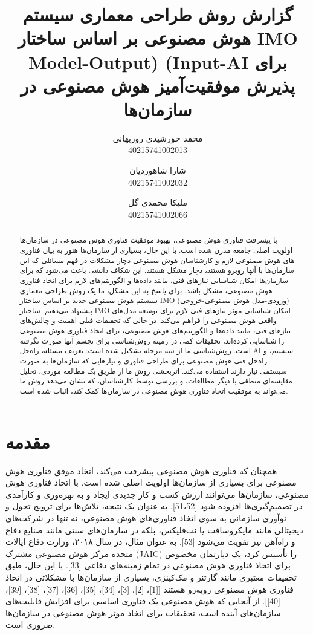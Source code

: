 \documentclass[a4paper,10pt]{article}
\title{گزارش روش طراحی معماری سیستم هوش مصنوعی بر اساس ساختار IMO Model-Output) (Input-AI برای پذیرش موفقیت‌آمیز هوش مصنوعی در سازمان‌ها}
\author{محمد خورشیدی روزبهانی\\40215741002013 \and شارا شاهوردیان\\40215741002032 \and ملیکا محمدی گل\\40215741002066}
\date{}
\begin{document}
    \maketitle

    \vspace{0.5cm}

    \begin{abstract}
        
        با پیشرفت فناوری هوش مصنوعی، بهبود موفقیت فناوری هوش مصنوعی در سازمان‌ها اولویت اصلی جامعه مدرن شده است. با این حال، بسیاری از سازمان‌ها هنوز به بیان فناوری های هوش مصنوعی لازم و کارشناسان هوش مصنوعی دچار مشکلات در فهم مسائلی که این سازمان‌ها با آنها روبرو هستند، دچار مشکل هستند. این شکاف دانشی باعث می‌شود که برای سازمان‌ها امکان شناسایی نیازهای فنی، مانند داده‌ها و الگوریتم‌های لازم برای اتخاذ فناوری هوش مصنوعی، مشکل باشد. برای پاسخ به این مشکل، ما یک روش طراحی معماری سیستم هوش مصنوعی جدید بر اساس ساختار IMO (ورودی-مدل هوش مصنوعی-خروجی) پیشنهاد می‌دهیم. ساختار IMO امکان شناسایی موثر نیازهای فنی لازم برای توسعه مدل‌های واقعی هوش مصنوعی را فراهم می‌کند. در حالی که تحقیقات قبلی اهمیت و چالش‌های نیازهای فنی، مانند داده‌ها و الگوریتم‌های هوش مصنوعی، برای اتخاذ فناوری هوش مصنوعی را شناسایی کرده‌اند، تحقیقات کمی در زمینه روش‌شناسی برای تجسم آنها صورت نگرفته است. روش‌شناسی ما از سه مرحله تشکیل شده است: تعریف مسئله، راه‌حل AI سیستم، و راه‌حل فنی هوش مصنوعی برای طراحی فناوری و نیازهایی که سازمان‌ها به صورت سیستمی نیاز دارند استفاده می‌کند. اثربخشی روش ما از طریق یک مطالعه موردی، تحلیل مقایسه‌ای منطقی با دیگر مطالعات، و بررسی توسط کارشناسان، که نشان می‌دهد روش ما می‌تواند به موفقیت اتخاذ فناوری هوش مصنوعی در سازمان‌ها کمک کند، اثبات شده است.

    \end{abstract}

    \section{مقدمه}

        همچنان که فناوری هوش مصنوعی پیشرفت می‌کند، اتخاذ موفق فناوری هوش مصنوعی برای بسیاری از سازمان‌ها اولویت اصلی شده است. با اتخاذ فناوری هوش مصنوعی، سازمان‌ها می‌توانند ارزش کسب و کار جدیدی ایجاد و به بهره‌وری و کارآمدی در تصمیم‌گیری‌ها افزوده شود [51،52]. به عنوان یک نتیجه، تلاش‌ها برای ترویج تحول و نوآوری سازمانی به سوی اتخاذ فناوری‌های هوش مصنوعی، نه تنها در شرکت‌های دیجیتالی مانند مایکروسافت یا نت‌فلیکس، بلکه در سازمان‌های سنتی مانند صنایع دفاع و راه‌آهن نیز تقویت می‌شود [53]. به عنوان مثال، در سال ۲۰۱۸، وزارت دفاع ایالات متحده مرکز هوش مصنوعی مشترک (JAIC) را تأسیس کرد، یک دپارتمان مخصوص برای اتخاذ فناوری هوش مصنوعی در تمام زمینه‌های دفاعی [33]. با این حال، طبق تحقیقات معتبری مانند گارتنر و مک‌کینزی، بسیاری از سازمان‌ها با مشکلاتی در اتخاذ فناوری هوش مصنوعی روبه‌رو هستند [[1]، [2]، [3]، [34]، [35]، [36]، [37]، [38]، [39]، [40]]. از آنجایی که هوش مصنوعی یک فناوری اساسی برای افزایش قابلیت‌های سازمان‌های آینده است، تحقیقات برای اتخاذ موثر هوش مصنوعی در سازمان‌ها ضروری است.
\end{document}
